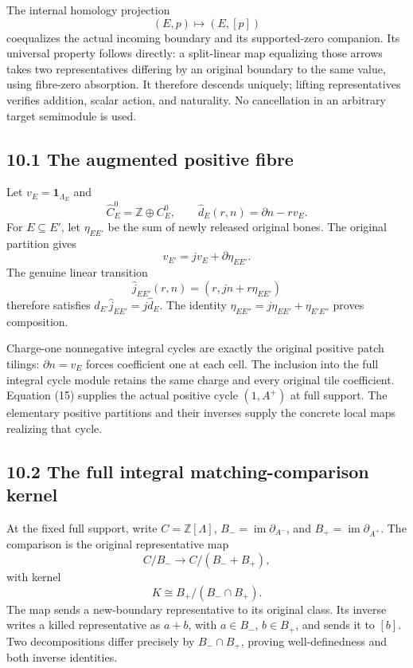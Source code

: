 \documentclass[
  11pt,
]{article}
\begin{document}
The internal homology projection \[
 (E,p)\longmapsto(E,[p])
\] coequalizes the actual incoming boundary and its supported-zero
companion. Its universal property follows directly: a split-linear map
equalizing those arrows takes two representatives differing by an
original boundary to the same value, using fibre-zero absorption. It
therefore descends uniquely; lifting representatives verifies addition,
scalar action, and naturality. No cancellation in an arbitrary target
semimodule is used.

\subsection{10.1 The augmented positive
fibre}\label{the-augmented-positive-fibre}

Let \(v_E=\mathbf1_{\Lambda_E}\) and \[
 \widehat C_E^0=\mathbb Z\oplus C_E^0,
 \qquad\widehat d_E(r,n)=\partial n-rv_E.
\] For \(E\subseteq E'\), let \(\eta_{EE'}\) be the sum of newly
released original bones. The original partition gives \[
 v_{E'}=jv_E+\partial\eta_{EE'}.
\] The genuine linear transition \[
 \widehat j_{EE'}(r,n)=(r,jn+r\eta_{EE'})
\] therefore satisfies
\(\widehat d_{E'}\widehat j_{EE'}=j\widehat d_E\). The identity
\(\eta_{EE''}=j\eta_{EE'}+\eta_{E'E''}\) proves composition.

Charge-one nonnegative integral cycles are exactly the original positive
patch tilings: \(\partial n=v_E\) forces coefficient one at each cell.
The inclusion into the full integral cycle module retains the same
charge and every original tile coefficient. Equation (15) supplies the
actual positive cycle \((1,A^+)\) at full support. The elementary
positive partitions and their inverses supply the concrete local maps
realizing that cycle.

\subsection{10.2 The full integral matching-comparison
kernel}\label{the-full-integral-matching-comparison-kernel}

At the fixed full support, write \(C=\mathbb Z[\Lambda]\),
\(B_-=\operatorname{im}\partial_{A^-}\), and
\(B_+=\operatorname{im}\partial_{A^+}\). The comparison is the original
representative map \[
 C/B_-\longrightarrow C/(B_-+B_+),
\] with kernel \[
 K\cong B_+/(B_-\cap B_+).                                \tag{16}
\] The map sends a new-boundary representative to its original class.
Its inverse writes a killed representative as \(a+b\), with
\(a\in B_-\), \(b\in B_+\), and sends it to \([b]\). Two decompositions
differ precisely by \(B_-\cap B_+\), proving well-definedness and both
inverse identities.
\end{document}
